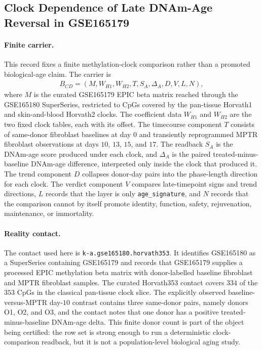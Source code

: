 \subsection{Clock Dependence of Late DNAm-Age Reversal in GSE165179}\label{sec:bioreality-age-clock-shift-clock-dependence-gse165180}

\paragraph{Finite carrier.}
This record fixes a finite methylation-clock comparison rather than a promoted biological-age claim.  The carrier is
$$
\begin{aligned}
B_{CD}=(M,W_{H1},W_{H2},T,S_A,\Delta_A,D,V,L,N),
\end{aligned}
$$
where $M$ is the curated GSE165179 EPIC beta matrix reached through the GSE165180 SuperSeries, restricted to CpGs covered by the pan-tissue Horvath1 and skin-and-blood Horvath2 clocks.  The coefficient data $W_{H1}$ and $W_{H2}$ are the two fixed clock tables, each with its offset.  The timecourse component $T$ consists of same-donor fibroblast baselines at day $0$ and transiently reprogrammed MPTR fibroblast observations at days $10$, $13$, $15$, and $17$.  The readback $S_A$ is the DNAm-age score produced under each clock, and $\Delta_A$ is the paired treated-minus-baseline DNAm-age difference, interpreted only inside the clock that produced it.  The trend component $D$ collapses donor-day pairs into the phase-length direction for each clock.  The verdict component $V$ compares late-timepoint signs and trend directions, $L$ records that the layer is only \texttt{age\_signature}, and $N$ records that the comparison cannot by itself promote identity, function, safety, rejuvenation, maintenance, or immortality.

\paragraph{Reality contact.}
The contact used here is \texttt{k-a.gse165180.horvath353}.  It identifies GSE165180 as a SuperSeries containing GSE165179 and records that GSE165179 supplies a processed EPIC methylation beta matrix with donor-labelled baseline fibroblast and MPTR fibroblast samples.  The curated Horvath353 contact covers $334$ of the $353$ CpGs in the classical pan-tissue clock slice.  The explicitly observed baseline-versus-MPTR day-$10$ contrast contains three same-donor pairs, namely donors O1, O2, and O3, and the contact notes that one donor has a positive treated-minus-baseline DNAm-age delta.  This finite donor count is part of the object being certified: the row set is strong enough to run a deterministic clock-comparison readback, but it is not a population-level biological aging study.


